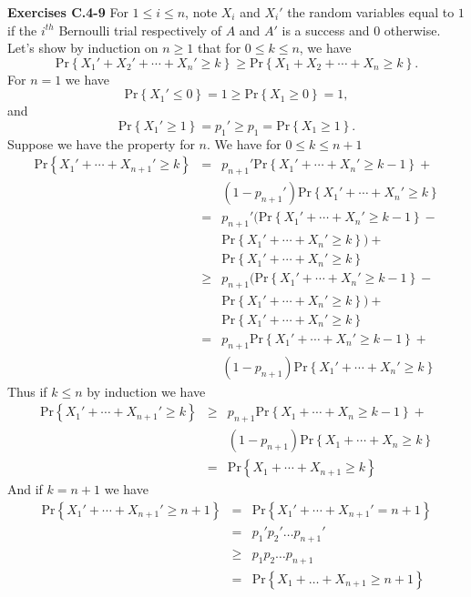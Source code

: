 \documentclass[a4paper,12pt]{article}
\newcommand{\newpar}[1]
{\bigskip \noindent \textbf{Exercises #1} \newline}
\newcommand{\prob}[1]{\mathrm{Pr}\left\{ #1 \right\}}
\begin{document}
\newpar{C.4-9}
For $1\le i\le n$, note $X_i$ and $X_i'$ the random variables equal to
$1$ if the $i^{th}$ Bernoulli trial respectively of $A$ and $A'$ is a
success and $0$ otherwise.  Let's show by induction on $n\ge1$ that
for $0\le k\le n$, we have
\[  \prob{X_1{}'+X_2{}'+\cdots+X_n{}'\ge k} \ge
\prob{X_1+X_2+\cdots+X_n\ge k}.\]
For $n=1$ we have
\[ \prob{X_1{}' \le 0} = 1 \ge \prob{X_1 \ge 0} = 1,\]
and
\[ \prob{X_1{}' \ge 1} = p_1{}' \ge p_1 = \prob{X_1 \ge 1}.\]
Suppose we have the property for $n$. We have for $0 \le k\le n+1$
\begin{eqnarray*}
  \prob{X_1{}'+\cdots+X_{n+1}{}'\ge k} &=&
  p_{n+1}{}'\prob{X_1{}'+\cdots+X_n{}'\ge k-1} + \\
  && (1-p_{n+1}{}')\prob{X_1{}'+\cdots+X_n{}'\ge k} \\
  &=& p_{n+1}{}'(\prob{X_1{}'+\cdots+X_n{}'\ge k-1} -\\
  &&\prob{X_1{}'+\cdots+X_n{}'\ge k}) + \\
  &&\prob{X_1{}'+\cdots+X_n{}'\ge k} \\
  &\ge& p_{n+1}(\prob{X_1{}'+\cdots+X_n{}'\ge k-1}-\\
  && \prob{X_1{}'+\cdots+X_n{}'\ge k}) + \\
  && \prob{X_1{}'+\cdots+X_n{}'\ge k} \\
  &=& p_{n+1}\prob{X_1{}'+\cdots+X_n{}'\ge k-1} + \\
  && (1-p_{n+1})\prob{X_1{}'+\cdots+X_n{}'\ge k}
\end{eqnarray*}
Thus if $k\le n$ by induction we have
\begin{eqnarray*}
  \prob{X_1{}'+\cdots+X_{n+1}{}'\ge k} &\ge&
  p_{n+1}\prob{X_1+\cdots+X_n\ge k-1}+ \\
  && (1-p_{n+1})\prob{X_1+\cdots+X_n\ge k} \\
  &=& \prob{X_1+\cdots+X_{n+1}\ge k}
\end{eqnarray*}
And if $k=n+1$ we have
\begin{eqnarray*}
  \prob{X_1{}'+\cdots+X_{n+1}{}'\ge n+1} &=&
  \prob{X_1{}'+\cdots+X_{n+1}{}'= n+1} \\
  &=& p_1{}'p_2{}'\ldots p_{n+1}{}' \\
  &\ge& p_1 p_2 \ldots p_{n+1} \\
  &=& \prob{X_1+\ldots+ X_{n+1}\ge n+1}
\end{eqnarray*}
\end{document}
